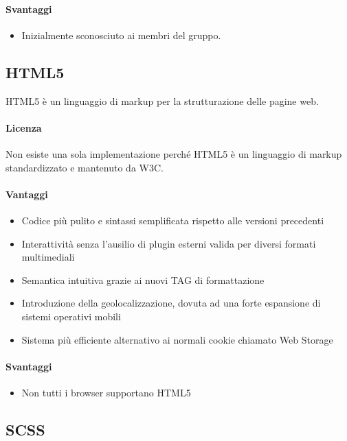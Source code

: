 \paragraph{Svantaggi} 
\begin{itemize}
	\item Inizialmente sconosciuto ai membri del gruppo.	
\end{itemize}

\subsection{HTML5}
HTML5 è un linguaggio di markup per la strutturazione delle pagine web.

\paragraph{Licenza}  
Non esiste una sola implementazione perché HTML5 è un linguaggio di markup standardizzato e mantenuto da W3C.



\paragraph{Vantaggi}
\begin{itemize}
	\item Codice più pulito e sintassi semplificata rispetto alle versioni precedenti
	\item Interattività senza l’ausilio di plugin esterni valida per diversi formati multimediali
	\item Semantica intuitiva grazie ai nuovi TAG di formattazione
	\item Introduzione della geolocalizzazione, dovuta ad una forte espansione di sistemi operativi mobili
	\item Sistema più efficiente alternativo ai normali cookie chiamato Web Storage 

\end{itemize}

\paragraph{Svantaggi} 
\begin{itemize}
	\item Non tutti i browser supportano HTML5
\end{itemize}

\subsection{SCSS}


